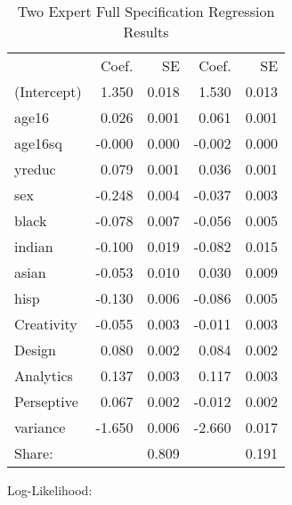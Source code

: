 \documentclass[12pt]{article}
\begin{document}
\begin{table} \centering
  \caption{Two Expert Full Specification Regression Results}
    \begin{threeparttable}
      \begin{tabular}[l]{l r r r r}
\cmidrule{1-5}
                & Coef.  &  SE   &  Coef.   & SE  \\
\cmidrule(l){2-3}  \cmidrule(l){4-5}
(Intercept)     &    1.350  &    0.018   &     1.530   &   0.013  \\
age16           &    0.026  &    0.001   &     0.061   &   0.001  \\
age16sq         &   -0.000  &    0.000   &    -0.002   &   0.000  \\
yreduc          &    0.079  &    0.001   &     0.036   &   0.001  \\
sex             &   -0.248  &    0.004   &    -0.037   &   0.003  \\
black           &   -0.078  &    0.007   &    -0.056   &   0.005  \\
indian          &   -0.100  &    0.019   &    -0.082   &   0.015  \\
asian           &   -0.053  &    0.010   &     0.030   &   0.009  \\
hisp            &   -0.130  &    0.006   &    -0.086   &   0.005  \\
Creativity      &   -0.055  &    0.003   &    -0.011   &   0.003  \\
Design          &    0.080  &    0.002   &     0.084   &   0.002  \\
Analytics       &    0.137  &    0.003   &     0.117   &   0.003  \\
Perseptive      &    0.067  &    0.002   &    -0.012   &   0.002  \\
variance        &   -1.650  &    0.006   &    -2.660   &   0.017  \\
\cmidrule(l){2-3}  \cmidrule(l){4-5}
Share:          &           &    0.809   &             &   0.191  \\
\cmidrule{1-5}
      \end{tabular}

      \begin{tablenotes}
        \item Log-Likelihood: 

      \end{tablenotes} \label{tbl:2E_full_regressions_results}


    \end{threeparttable}

\end{table}
\end{document}
